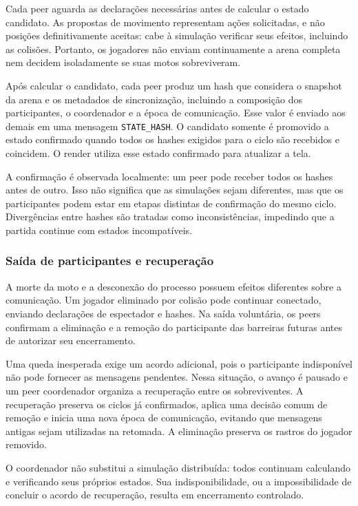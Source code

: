 \documentclass[11pt,a4paper]{article}
\begin{document}
Cada peer aguarda as declarações necessárias antes de calcular o estado candidato. As propostas de movimento representam ações solicitadas, e não posições definitivamente aceitas: cabe à simulação verificar seus efeitos, incluindo as colisões. Portanto, os jogadores não enviam continuamente a arena completa nem decidem isoladamente se suas motos sobreviveram.

Após calcular o candidato, cada peer produz um hash que considera o snapshot da arena e os metadados de sincronização, incluindo a composição dos participantes, o coordenador e a época de comunicação. Esse valor é enviado aos demais em uma mensagem \texttt{STATE\_HASH}. O candidato somente é promovido a estado confirmado quando todos os hashes exigidos para o ciclo são recebidos e coincidem. O render utiliza esse estado confirmado para atualizar a tela.

A confirmação é observada localmente: um peer pode receber todos os hashes antes de outro. Isso não significa que as simulações sejam diferentes, mas que os participantes podem estar em etapas distintas de confirmação do mesmo ciclo. Divergências entre hashes são tratadas como inconsistências, impedindo que a partida continue com estados incompatíveis.

\subsubsection{Saída de participantes e recuperação}

A morte da moto e a desconexão do processo possuem efeitos diferentes sobre a comunicação. Um jogador eliminado por colisão pode continuar conectado, enviando declarações de espectador e hashes. Na saída voluntária, os peers confirmam a eliminação e a remoção do participante das barreiras futuras antes de autorizar seu encerramento.

Uma queda inesperada exige um acordo adicional, pois o participante indisponível não pode fornecer as mensagens pendentes. Nessa situação, o avanço é pausado e um peer coordenador organiza a recuperação entre os sobreviventes. A recuperação preserva os ciclos já confirmados, aplica uma decisão comum de remoção e inicia uma nova época de comunicação, evitando que mensagens antigas sejam utilizadas na retomada. A eliminação preserva os rastros do jogador removido.

O coordenador não substitui a simulação distribuída: todos continuam calculando e verificando seus próprios estados. Sua indisponibilidade, ou a impossibilidade de concluir o acordo de recuperação, resulta em encerramento controlado.
\end{document}
